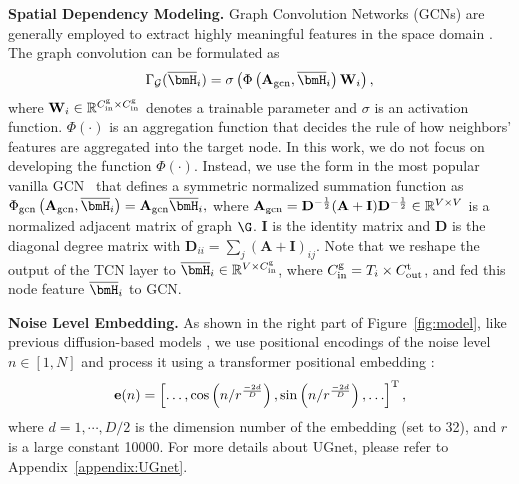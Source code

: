 {\par \textbf{Spatial Dependency Modeling.} Graph Convolution Networks (GCNs) are generally employed to extract highly meaningful features in the space domain \cite{survey-GNN-2020}. The graph convolution can be formulated as
\begin{equation}
    \Gamma_{\mathcal G}( \overline{\bmH}_i )  =\sigma \left(\Phi \left(\mathbf{A}_{\rm gcn},\overline{\bmH}_i\right) \mathbf{W}_i\right),
\end{equation}
where $\mathbf{W}_i \in \mathbb{R}^{C_{\rm in}^{\rm g} \times C_{\rm in}^{\rm g}}$ denotes a trainable parameter and $\sigma$ is an activation function.
$\Phi(\cdot)$ is an aggregation function that decides the rule of how neighbors' features are aggregated into the target node.  In this work, we do not focus on developing the function $\Phi(\cdot)$. Instead, we use the form in the most popular vanilla GCN~\cite{GCN-kipf2017} that defines a symmetric normalized summation function as $\Phi_{\rm gcn}\left(\mathbf{A}_{\rm gcn},\overline{\bmH}_i\right) = \mathbf{A}_{\rm gcn} \overline{\bmH}_i,$ where $\mathbf{A}_{\rm gcn}=\mathbf{D}^{-\frac{1}{2}}(\mathbf{A}+\mathbf{I})\mathbf{D}^{-\frac{1}{2}} \in \mathbb{R}^{V \times V}$ is a normalized adjacent matrix of graph $\G$. $\mathbf{I}$ is the identity matrix and $\mathbf{D}$ is the diagonal degree matrix with $\mathbf{D}_{ii}=\sum_{j}(\mathbf{A}+\mathbf{I})_{ij}$. Note that we reshape the output of the TCN layer to $\overline{\bmH}_i \in \mathbb{R}^{V \times  C_{\rm in}^{\rm g}}$, where $C_{\rm in}^{\rm g} = T_{i} \times C_{\rm out}^{\rm t}$, and fed this node feature $\overline{\bmH}_i$  to GCN. 

\par \textbf{Noise Level Embedding.} As shown in the right part of Figure~\ref{fig:model}, like previous diffusion-based models \cite{rasul2021autoregressive}, we use positional encodings of the noise level $n \in [1,N]$ and process it using a transformer positional embedding \cite{vaswani2017attention}:
\begin{equation}
\small
    \mathbf{e}(n)=\left[\ldots, \cos \left(n / r^{\frac{-2 d}{D}}\right), \sin \left(n / r^{\frac{-2 d}{D}}\right), \ldots\right]^{\mathrm{T}},
\end{equation}
where $d=1,\cdots, D/2$ is the dimension number of the embedding (set to 32), and $r$ is a large constant 10000. For more details about UGnet, please refer to Appendix~\ref{appendix:UGnet}.

}
